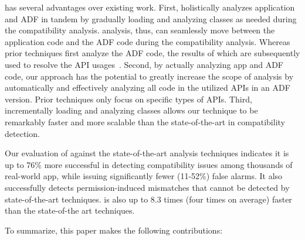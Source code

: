 \@approach has several advantages over existing work.
First, \@approach holistically analyzes application and
ADF in tandem by gradually loading and analyzing
classes as needed during the compatibility analysis.
\@approach analysis, thus, can seamlessly move between
the application code and the ADF code during the
compatibility analysis.  Whereas prior techniques first
analyze the ADF code, the results of which are
subsequently used to resolve the API
usages~\cite{huang2018understanding,linttips,
lili2018cid}. Second, by actually analyzing app and ADF
code, our approach has the potential to greatly
increase the scope of analysis by automatically and
effectively analyzing all code in the utilized APIs in
an ADF version.  Prior techniques only focus on
specific types of APIs.  Third, incrementally loading
and analyzing classes allows our technique to be
remarkably faster and more scalable than the
state-of-the-art in compatibility detection.  


Our evaluation of \@approach against the
state-of-the-art analysis techniques indicates it 
is up to 76\% more successful in detecting
compatibility issues among thousands of real-world app, while issuing significantly fewer
(11-52\%) false alarms.  It also successfully detects
permission-induced mismatches that cannot be
detected by state-of-the-art techniques. 
\@approach is also up to 8.3 times (four times on average)
faster than the state-of-the art techniques. 


To summarize,
this paper makes the following contributions:
 
